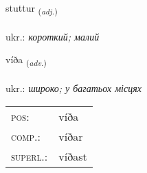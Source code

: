 \documentclass[frontgrid, backgrid]{flacards}\usepackage[]{graphicx}\usepackage[]{xcolor}
\begin{document}
\renewcommand{\flhead}{\vskip5pt \fboxsep=0pt {\small\bfseries\footnotesize Lýsingarorð | прикметник}}
\renewcommand{\fcfoot}{\vskip5pt \fboxsep=0pt \hspace{2pt}{\small\bfseries\footnotesize 1K}}

\renewcommand{\blhead}{\vskip5pt {\small\bfseries\footnotesize Lýsingarorð | прикметник }}
\renewcommand{\bcfoot}{\vskip5pt \hspace{2pt}{\small\bfseries\footnotesize 1K}}


{stuttur \small{\textsubscript{(\textit{adj.})}} \\[1ex] %
\textphonetic{[stʏhtʏr]} \\
ukr.: \emph{короткий; малий} \\  [2ex]
\renewcommand*{\arraystretch}{0.8}
}

\renewcommand{\flhead}{\vskip5pt \fboxsep=0pt {\small\bfseries\footnotesize Atviksorð | прислівник}}
\renewcommand{\fcfoot}{\vskip5pt \fboxsep=0pt \hspace{2pt}{\small\bfseries\footnotesize 1K}}

\renewcommand{\blhead}{\vskip5pt {\small\bfseries\footnotesize Atviksorð | прислівник }}
\renewcommand{\bcfoot}{\vskip5pt \hspace{2pt}{\small\bfseries\footnotesize 1K}}


{víða \small{\textsubscript{(\textit{adv.})}} \\[1ex] %
\textphonetic{[viːða]} \\
ukr.: \emph{широко; у багатьох місцях} \\  [2ex]
\renewcommand*{\arraystretch}{0.8}
\begin{tabular}{ll}
\textsc{pos}: & víða \\ 
\textsc{comp.}: & víðar \\ 
\textsc{superl.}: & víðast \\
\end{tabular}
}
\end{document}
